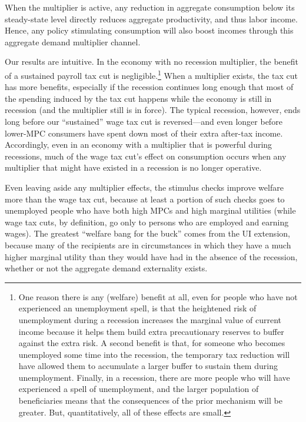 \documentclass[\latexroot/\projectname]{subfiles}
\begin{document}

When the multiplier is active, any reduction in aggregate consumption below its steady-state level directly reduces aggregate productivity, and thus labor income. Hence, any policy stimulating consumption will also boost incomes through this aggregate demand multiplier channel.

Our results are intuitive.  In the economy with no recession multiplier, the benefit of a sustained payroll tax cut is negligible.\footnote{One reason there is any (welfare) benefit at all, even for people who have not experienced an unemployment spell, is that the heightened risk of unemployment during a recession increases the marginal value of current income because it helps them build extra precautionary reserves to buffer against the extra risk.  A second benefit is that, for someone who becomes unemployed some time into the recession, the temporary tax reduction will have allowed them to accumulate a larger buffer to sustain them during unemployment.  Finally, in a recession, there are more people who will have experienced a spell of unemployment, and the larger population of beneficiaries means that the consequences of the prior mechanism will be greater.  But, quantitatively, all of these effects are small.}
When a multiplier exists, the tax cut has more benefits, especially if the recession continues long enough that most of the spending induced by the tax cut happens while the economy is still in recession (and the multiplier still is in force).  The typical recession, however, ends long before our ``sustained'' wage tax cut is reversed---and even longer before lower-MPC consumers have spent down most of their extra after-tax income. Accordingly, even in an economy with a multiplier that is powerful during recessions, much of the wage tax cut's effect on consumption occurs when any multiplier that might have existed in a recession is no longer operative.

Even leaving aside any multiplier effects, the stimulus checks improve welfare more than the wage tax cut, because at least a portion of such checks goes to unemployed people who have both high MPCs and high marginal utilities (while wage tax cuts, by definition, go only to persons who are employed and earning wages). The greatest ``welfare bang for the buck'' comes from the UI extension, because many of the recipients are in circumstances in which they have a much higher marginal utility than they would have had in the absence of the recession, whether or not the aggregate demand externality exists.
\end{document}
